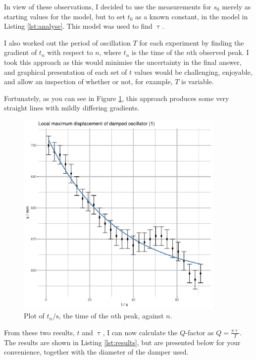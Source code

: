 \documentclass[a4paper,11pt]{article}
\begin{document}
In view of these observations, I decided to use the measurements for $s_0$
merely as starting values for the model, but to set $t_0$ as a known constant,
in the model in Listing \ref{lst:analyse}. This model was used to find $\uptau$.

I also worked out the period of oscillation $T$ for each experiment by finding
the gradient of $t_n$ with respect to $n$, where $t_n$ is the time of the $n$th
observed peak. I took this approach as this would minimise the uncertainty in
the final answer, and graphical presentation of each set of $t$ values would be
challenging, enjoyable, and allow an inspection of whether or not, for example,
$T$ is variable.

Fortunately, as you can see in Figure \ref{fig:period}, this approach produces
some very straight lines with mildly differing gradients.

\begin{figure}[H]
\begin{center}
\includegraphics[width=0.9\textwidth,page=5]{Rplots.pdf}
\end{center}
\caption{Plot of $t_n/\si{\second}$, the time of the $n$th peak, against $n$.}
\label{fig:period}
\end{figure}

From these two results, $t$ and $\uptau$, I can now calculate the $Q$-factor as
$\displaystyle Q = \frac {\pi\uptau} T$. The results are shown in Listing
\ref{lst:results}, but are presented below for your convenience, together with
the diameter of the damper used.
\end{document}

